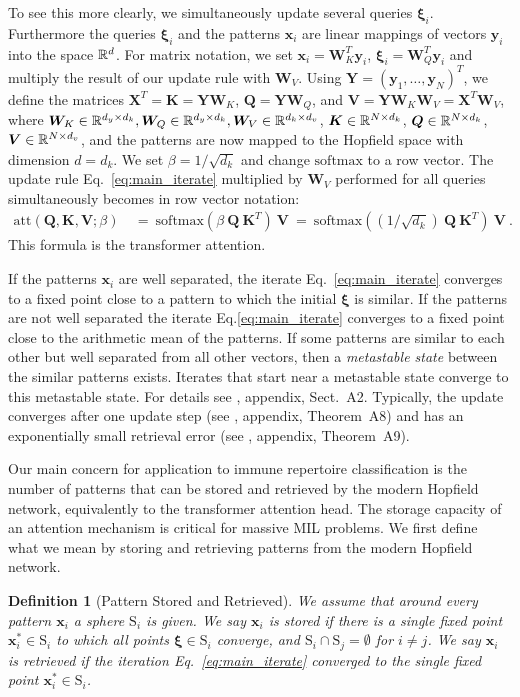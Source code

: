 \documentclass[oneside]{book}
\newtheorem{definition}{Definition}
\newcommand\Bx{\bm{x}}
\newcommand\By{\bm{y}}
\newcommand\BK{\bm{K}}
\newcommand\BQ{\bm{Q}}
\newcommand\BV{\bm{V}}
\newcommand\BW{\bm{W}}
\newcommand\BX{\bm{X}}
\newcommand\BY{\bm{Y}}
\newcommand\Bxi{\bm{\xi}}
\newcommand{\rS}{\mathrm{S}} \newcommand{\rT}{\mathrm{T}}
\newcommand\att{\mathrm{att}}
\newcommand{\soft}{\mathrm{softmax}}
\begin{document}
To see this more clearly, we simultaneously update several queries $\Bxi_i$.
Furthermore the queries $\Bxi_i$ and the patterns $\Bx_i$ are 
linear mappings of vectors $\By_i$ into the space $\mathbb{R}^d$.
For matrix notation,
we set $\Bx_i = \BW_K^T \By_i$, $\Bxi_i = \BW_Q^T \By_i$
and multiply the result of our update rule with $\BW_V$.
Using $\BY=(\By_1,\ldots,\By_N)^T$, we define
the matrices $\BX^T=\BK = \BY \BW_K $, $\BQ = \BY \BW_Q$,
and $\BV=\BY \BW_K \BW_V=\BX^T \BW_V$, where 
$\BW_K \in \dR^{d_y\times d_k}, \BW_Q \in \dR^{d_y\times d_k}, \BW_V \in \dR^{d_k\times d_v}$,
$\BK \in \dR^{N \times d_k}$, $\BQ \in \dR^{N \times d_k}$, $\BV \in \dR^{N \times d_v}$, and
the patterns are now mapped to the Hopfield space with dimension $d=d_k$. 
We set $\beta = 1/\sqrt{d_k}$ and change
$\soft$ to a row vector.
The update rule Eq.~\eqref{eq:main_iterate} multiplied by $\BW_V$
performed for all queries simultaneously becomes in row vector notation:
\begin{align}
 \label{eq:attention}
  \att(\BQ,\BK,\BV; \beta) \ &= \ \soft \left( \beta \ \BQ \ \BK^T \right) \ \BV \ = \ \soft \left( \left( 1/\sqrt{d_k} \right) \ \BQ \ \BK^T \right) \ \BV \ .
\end{align}
This formula is the transformer attention.
%

%
If the patterns $\Bx_i$ are well separated, the iterate Eq.~\eqref{eq:main_iterate}
converges to a fixed point close to a pattern to which the initial $\Bxi$ is similar. 
If the patterns are not well separated 
the iterate Eq.\eqref{eq:main_iterate} converges to 
a fixed point close to the arithmetic mean of the patterns. 
If some patterns are 
similar to each other but well separated from all
other vectors, then a {\em metastable state} between the similar
patterns exists. Iterates that start near a metastable state converge
to this metastable state.
For details see \cite{Ramsauer:20}, appendix, Sect.~A2. %
Typically, the update converges after one update step
(see \cite{Ramsauer:20}, appendix, Theorem~A8) %
%
and has an exponentially small retrieval error 
(see \cite{Ramsauer:20}, appendix, Theorem~A9). %
%

%
Our main concern for application to 
immune repertoire classification 
is the number of patterns that can be 
stored and retrieved by the modern Hopfield network, equivalently to 
the transformer attention head. 
The storage capacity of an attention mechanism is critical for 
massive MIL problems.
We first define what we mean by storing and retrieving patterns
from the modern Hopfield network.
\begin{definition}[Pattern Stored and Retrieved]
We assume that around every pattern $\Bx_i$ a sphere $\rS_i$ is given.
We say {\em $\Bx_i$ is stored} if there is 
a single fixed point $\Bx_i^* \in \rS_i$ to
which all points $\Bxi \in \rS_i$ converge,
and  $\rS_i \cap \rS_j = \emptyset$ for $i \not= j$.
We say {\em $\Bx_i$ is retrieved} if 
the iteration Eq.~\eqref{eq:main_iterate}
converged to the single fixed point $\Bx_i^* \in \rS_i$.
%
\end{definition}
\end{document}
